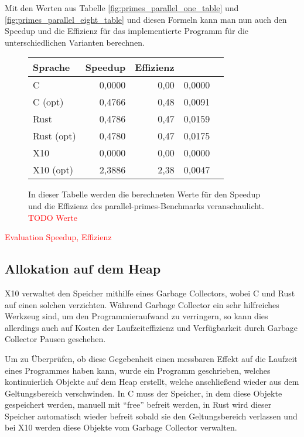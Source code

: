Mit den Werten aus Tabelle \ref{fig:primes_parallel_one_table} und \ref{fig:primes_parallel_eight_table} und diesen
Formeln kann man nun auch den Speedup und die Effizienz für das implementierte Programm für die unterschiedlichen
Varianten berechnen.

\begin{figure}[hb]
	\begin{center}
		\begin{tabular}{lrrrr}
			\toprule
			Sprache & Speedup & Effizienz \\
			\midrule
			C          & 0,0000 & 0,00 & 0,0000 \\
			C (opt)    & 0,4766 & 0,48 & 0,0091 \\
			Rust       & 0,4786 & 0,47 & 0,0159 \\
			Rust (opt) & 0,4780 & 0,47 & 0,0175 \\
			X10        & 0,0000 & 0,00 & 0,0000 \\
			X10 (opt)  & 2,3886 & 2,38 & 0,0047 \\
			\bottomrule
		\end{tabular}
	\end{center}
	\caption{
		In dieser Tabelle werden die berechneten Werte für den Speedup und die Effizienz des parallel-primes-Benchmarks
		veranschaulicht.
		\textcolor{red}{TODO Werte}
	}
	\label{fig:primes_parallel_speedup_efficiency_table}
\end{figure}

\textcolor{red}{Evaluation Speedup, Effizienz}



\subsection{Allokation auf dem Heap}

X10 verwaltet den Speicher mithilfe eines Garbage Collectors, wobei C und Rust auf einen solchen verzichten.
Während Garbage Collector ein sehr hilfreiches Werkzeug sind, um den Programmieraufwand zu verringern, so kann dies
allerdings auch auf Kosten der Laufzeiteffizienz und Verfügbarkeit durch Garbage Collector Pausen geschehen.

Um zu Überprüfen, ob diese Gegebenheit einen messbaren Effekt auf die Laufzeit eines Programmes haben kann,
wurde ein Programm geschrieben, welches kontinuierlich Objekte auf dem Heap erstellt,
welche anschließend wieder aus dem Geltungsbereich verschwinden.
In C muss der Speicher, in dem diese Objekte gespeichert werden, manuell mit "`free"' befreit werden,
in Rust wird dieser Speicher automatisch wieder befreit sobald sie den Geltungsbereich verlassen und bei
X10 werden diese Objekte vom Garbage Collector verwalten.

